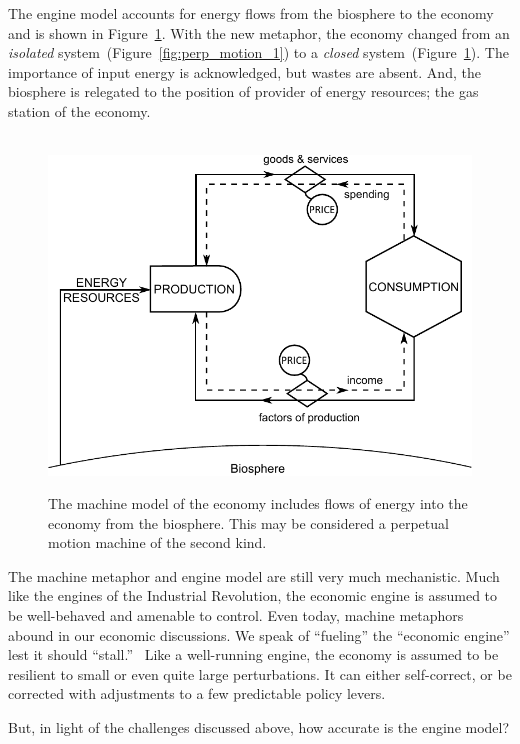 The engine model accounts for energy flows from the biosphere 
to the economy and is shown in Figure~\ref{fig:perp_motion_2}.
With the new metaphor, the economy changed from 
an \emph{isolated} system~(Figure~\ref{fig:perp_motion_1}) to 
a \emph{closed} system~(Figure~\ref{fig:perp_motion_2}). 
The importance of input energy is acknowledged, 
but wastes are absent.
And, the biosphere is relegated to the position
of provider of energy resources;
the gas station of the economy.\cite{Norgaard2010}

\begin{figure}[!ht]
\centering\
\includegraphics[width=\linewidth]{Part_0/Chapter_Introduction/images/Perpetual_motion_2.pdf}
\caption[The machine model]{The machine model of the economy includes
flows of energy into the economy from the biosphere.
This may be considered a perpetual motion machine 
of the second kind.}
\label{fig:perp_motion_2}
\end{figure}

The machine metaphor and engine model are still very much mechanistic.
Much like the engines of the Industrial Revolution,
the economic engine is assumed to be well-behaved and amenable to control.
Even today, machine metaphors abound in our economic discussions.
We speak of ``fueling'' the ``economic engine'' 
lest it should ``stall.''~\cite{Liu2012}
Like a well-running engine, the economy is assumed 
to be resilient to small or even quite large perturbations.  
It can either self-correct, 
or be corrected with adjustments to
a few predictable policy levers.

But, in light of the challenges discussed above,
how accurate is the engine model?


